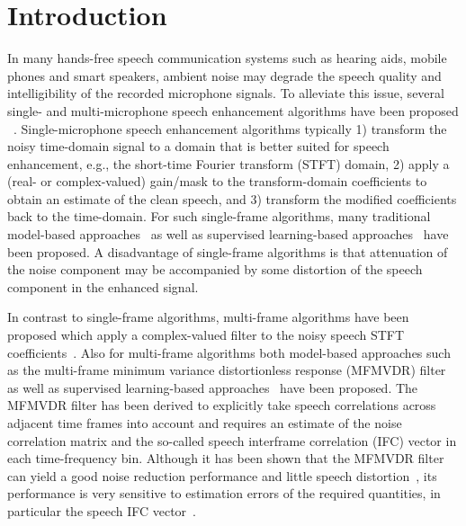 \documentclass{article}
\begin{document}
\section{Introduction}
In many hands-free speech communication systems such as hearing aids, mobile phones and smart speakers, ambient noise may degrade the speech quality and intelligibility of the recorded microphone signals. 
To alleviate this issue, several single- and multi-microphone speech enhancement algorithms have been proposed ~\cite{vary_digital_2006,hendriks_dft-domain_2013,benesty_speech_2011,doclo_multichannel_2015,vincent_audio_2018}. 
Single-microphone speech enhancement algorithms typically 1) transform the noisy time-domain signal to a domain that is better suited for speech enhancement, e.g., the short-time Fourier transform (STFT) domain, 2) apply a (real- or complex-valued) gain/mask to the transform-domain coefficients to obtain an estimate of the clean speech, and 3) transform the modified coefficients back to the time-domain.
For such single-frame algorithms, many traditional model-based approaches~\cite{vary_digital_2006,hendriks_dft-domain_2013,ephraim_speech_1984,gerkmann_phase_2015} as well as supervised learning-based approaches~\cite{xu_regression_2015,wang_training_2014,kolbaek_speech_2017,luo_conv-tasnet_2019,tan_gated_2019} have been proposed.
A disadvantage of single-frame algorithms is that attenuation of the noise component may be accompanied by some distortion of the speech component in the enhanced signal. 

In contrast to single-frame algorithms, multi-frame algorithms have been proposed which apply a complex-valued filter to the noisy speech STFT coefficients~\cite{benesty_speech_2011}.
Also for multi-frame algorithms both model-based approaches such as the multi-frame minimum variance distortionless response (MFMVDR) filter~\cite{huang_multi-frame_2012,schasse_estimation_2014,fischer_sensitivity_2017,fischer_subspace-based_2020} as well as supervised learning-based approaches~\cite{mack_deep_2019,xu_neural_2020} have been proposed.
The MFMVDR filter has been derived to explicitly take speech correlations across adjacent time frames into account and requires an estimate of the noise correlation matrix and the so-called speech interframe correlation (IFC) vector in each time-frequency bin.
Although it has been shown that the MFMVDR filter can yield a good noise reduction performance and little speech distortion~\cite{huang_multi-frame_2012,fischer_sensitivity_2017}, its performance is very sensitive to estimation errors of the required quantities, in particular the speech IFC vector~\cite{fischer_sensitivity_2017}. 
\end{document}
